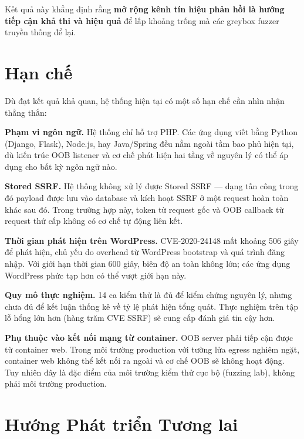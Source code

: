 Kết quả này khẳng định rằng \textbf{mở rộng kênh tín hiệu phản hồi
là hướng tiếp cận khả thi và hiệu quả} để lấp khoảng trống mà các
greybox fuzzer truyền thống để lại.

\section{Hạn chế}
\label{sec:limitations}

Dù đạt kết quả khả quan, hệ thống hiện tại có một số hạn chế cần
nhìn nhận thẳng thắn:

\textbf{Phạm vi ngôn ngữ.} Hệ thống chỉ hỗ trợ PHP. Các ứng dụng
viết bằng Python (Django, Flask), Node.js, hay Java/Spring đều nằm
ngoài tầm bao phủ hiện tại, dù kiến trúc OOB listener và cơ chế
phát hiện hai tầng về nguyên lý có thể áp dụng cho bất kỳ ngôn ngữ
nào.

\textbf{Stored SSRF.} Hệ thống không xử lý được Stored SSRF --- dạng
tấn công trong đó payload được lưu vào database và kích hoạt SSRF ở
một request hoàn toàn khác sau đó. Trong trường hợp này, token từ
request gốc và OOB callback từ request thứ cấp không có cơ chế tự
động liên kết.

\textbf{Thời gian phát hiện trên WordPress.} CVE-2020-24148 mất
khoảng 506 giây để phát hiện, chủ yếu do overhead từ WordPress
bootstrap và quá trình đăng nhập. Với giới hạn thời gian 600 giây,
biên độ an toàn không lớn; các ứng dụng WordPress phức tạp hơn có
thể vượt giới hạn này.

\textbf{Quy mô thực nghiệm.} 14 ca kiểm thử là đủ để kiểm chứng
nguyên lý, nhưng chưa đủ để kết luận thống kê về tỷ lệ phát hiện
tổng quát. Thực nghiệm trên tập lỗ hổng lớn hơn (hàng trăm CVE SSRF)
sẽ cung cấp đánh giá tin cậy hơn.

\textbf{Phụ thuộc vào kết nối mạng từ container.} OOB server phải
tiếp cận được từ container web. Trong môi trường production với tường
lửa egress nghiêm ngặt, container web không thể kết nối ra ngoài và
cơ chế OOB sẽ không hoạt động. Tuy nhiên đây là đặc điểm của môi
trường kiểm thử cục bộ (fuzzing lab), không phải môi trường production.

\section{Hướng Phát triển Tương lai}
\label{sec:future}

